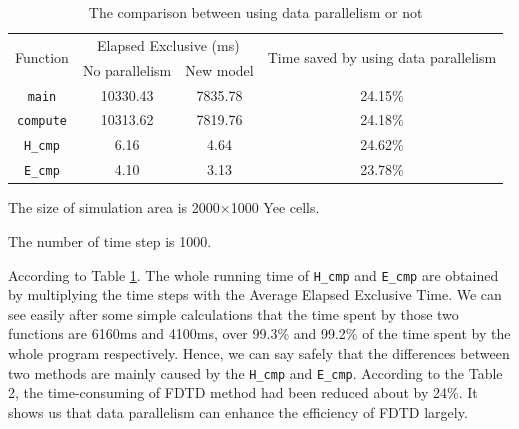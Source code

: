 \begin{table}[hp]
\centering
\begin{threeparttable}
	\caption{The comparison between using data parallelism or not}\label{ch3: data parallel or not}
	\begin{tabular}{cccc}
		\toprule
		\multirow{2}{3em}{Function}&\multicolumn{2}{c}{Elapsed Exclusive (ms)} & \multirow{2}{11em}{Time saved by using data parallelism}\\
		\cline{2-3}
		& No parallelism & New model & \\ 
		
		\midrule
		\lstinline|main| & 10330.43 & 7835.78 & 24.15\% \\ 
		\lstinline|compute| & 10313.62 & 7819.76 & 24.18\%\\ 
		\lstinline|H_cmp|& 6.16 & 4.64 & 24.62\%\\ 
		\lstinline|E_cmp|& 4.10 & 3.13 &23.78\% \\
		\bottomrule
	\end{tabular} 
	\begin{tablenotes}
		\item[1] The size of simulation area is 2000$\times$1000 Yee cells.
		\item[2] The number of time step is 1000.
	\end{tablenotes}
\end{threeparttable}
\end{table}

According to Table \ref{ch3: data parallel or not}. The whole running time of \lstinline|H_cmp| and \lstinline|E_cmp| are obtained by multiplying the time steps with the Average Elapsed Exclusive Time. We can see easily after some simple calculations that the time
spent by those two functions are 6160ms and 4100ms, over 99.3\% and 99.2\% of the time spent by the whole program respectively. Hence, we can say safely that the differences between two methods are mainly caused by the \lstinline|H_cmp| and \lstinline|E_cmp|. According to the Table 2, the time-consuming of FDTD method had been reduced about by 24\%. It shows us that data parallelism can enhance the efficiency of FDTD largely.

